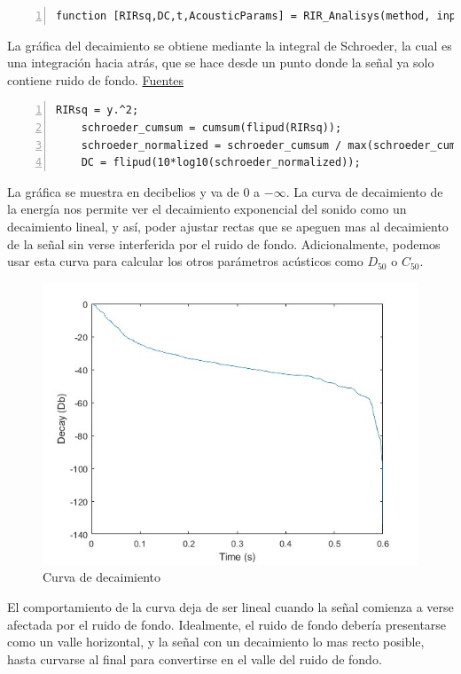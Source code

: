 \begin{lstlisting}[frame=single,numbers=left, style=Matlab-editor, basicstyle=\tiny]
function [RIRsq,DC,t,AcousticParams] = RIR_Analisys(method, input, room_dimensions,printFlag)
\end{lstlisting}
La gráfica del decaimiento se obtiene mediante la integral de Schroeder, la cual es una integración hacia atrás, que se hace desde un punto donde la señal ya solo contiene ruido de fondo. \href{https://www.roomeqwizard.com/help/help_en-GB/html/graph_filteredir.html}{Fuentes}
\begin{lstlisting}[frame=single,numbers=left, style=Matlab-editor, basicstyle=\tiny]
    RIRsq = y.^2;
    schroeder_cumsum = cumsum(flipud(RIRsq));
    schroeder_normalized = schroeder_cumsum / max(schroeder_cumsum);
    DC = flipud(10*log10(schroeder_normalized));
\end{lstlisting}
La gráfica se muestra en decibelios y va de 0 a $-\infty$. \hline\break
La curva de decaimiento de la energía nos permite ver el decaimiento exponencial del sonido como un decaimiento lineal, y así, poder ajustar rectas que se apeguen mas al decaimiento de la señal sin verse interferida por el ruido de fondo. Adicionalmente, podemos usar esta curva para calcular los otros parámetros acústicos como $D_{50}$ o $C_{50}$.\hfill\break
\begin{figure}[!htb]
    \centering
    \includegraphics[width=\linewidth]{imagenes/DecayCurve_RIR_Analysis.jpg}
    \caption{\footnotesize Curva de decaimiento}
    \label{fig:DecayCurve}
\end{figure}
\FloatBarrier
El comportamiento de la curva deja de ser lineal cuando la señal comienza a verse afectada por el ruido de fondo. Idealmente, el ruido de fondo debería presentarse como un valle horizontal, y la señal con un decaimiento lo mas recto posible, hasta curvarse al final para convertirse en el valle del ruido de fondo. \hfill\break
